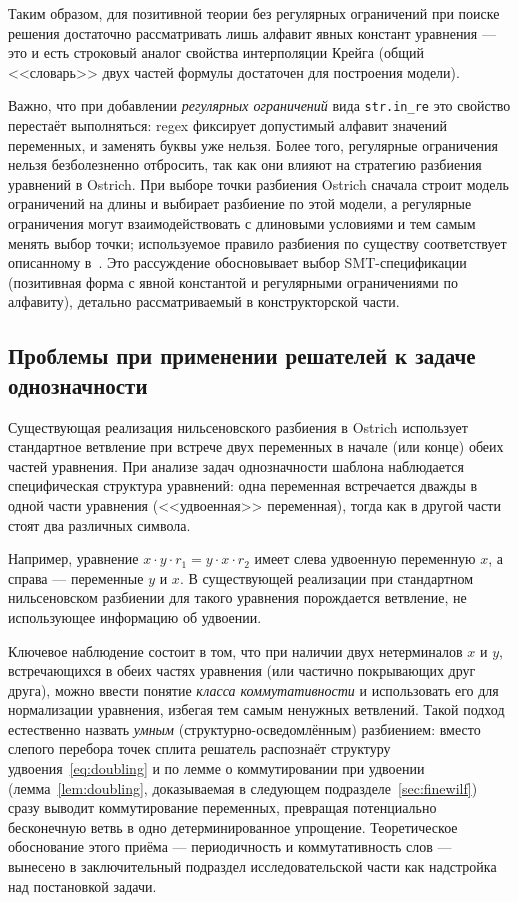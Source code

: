\documentclass[14pt, russian]{scrartcl}
\begin{document}
Таким образом, для позитивной теории без регулярных ограничений при поиске решения
достаточно рассматривать лишь алфавит явных констант уравнения --- это и есть
строковый аналог свойства интерполяции Крейга (общий <<словарь>> двух частей
формулы достаточен для построения модели).

Важно, что при добавлении \textit{регулярных ограничений} вида \verb|str.in_re| это
свойство перестаёт выполняться: regex фиксирует допустимый алфавит значений переменных,
и заменять буквы уже нельзя. Более того, регулярные ограничения нельзя безболезненно
отбросить, так как они влияют на стратегию разбиения уравнений в Ostrich. При выборе
точки разбиения Ostrich сначала строит модель ограничений на длины и выбирает разбиение
по этой модели, а регулярные ограничения могут взаимодействовать с длиновыми условиями
и тем самым менять выбор точки; используемое правило разбиения по существу соответствует
описанному в~\cite{abdulla2015}. Это рассуждение обосновывает выбор SMT-спецификации
(позитивная форма с явной константой и регулярными ограничениями по алфавиту), детально
рассматриваемый в конструкторской части.

\subsection{Проблемы при применении решателей к задаче однозначности}

Существующая реализация нильсеновского разбиения в Ostrich использует стандартное
ветвление при встрече двух переменных в начале (или конце) обеих частей уравнения.
При анализе задач однозначности шаблона наблюдается специфическая структура уравнений:
одна переменная встречается дважды в одной части уравнения (<<удвоенная>> переменная),
тогда как в другой части стоят два различных символа.

Например, уравнение $x \cdot y \cdot r_1 = y \cdot x \cdot r_2$ имеет слева
удвоенную переменную $x$, а справа --- переменные $y$ и $x$. В существующей реализации
при стандартном нильсеновском разбиении для такого уравнения порождается ветвление,
не использующее информацию об удвоении.

Ключевое наблюдение состоит в том, что при наличии двух нетерминалов $x$ и $y$,
встречающихся в обеих частях уравнения (или частично покрывающих друг друга), можно
ввести понятие \textit{класса коммутативности} и использовать его для нормализации уравнения,
избегая тем самым ненужных ветвлений. Такой подход естественно назвать \textit{умным}
(структурно-осведомлённым) разбиением: вместо слепого перебора точек сплита решатель
распознаёт структуру удвоения~\eqref{eq:doubling} и по лемме о коммутировании при
удвоении (лемма~\ref{lem:doubling}, доказываемая в следующем
подразделе~\ref{sec:finewilf}) сразу выводит коммутирование переменных, превращая
потенциально бесконечную ветвь в одно детерминированное упрощение. Теоретическое
обоснование этого приёма --- периодичность и коммутативность слов --- вынесено в
заключительный подраздел исследовательской части как надстройка над постановкой задачи.
\end{document}
